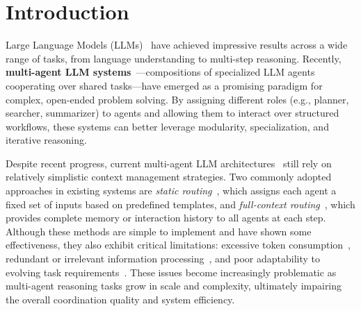 \documentclass[letterpaper]{article} %
\begin{document}
\section{Introduction}

Large Language Models (LLMs)~\cite{team2023gemini,touvron2023llama,vicuna2023,liu2024deepseek,lu2024deepseek} have achieved impressive results across a wide range of tasks, from language understanding to multi-step reasoning. Recently, \textbf{multi-agent LLM systems}~\cite{wu2023autogen,han2024llm,ye2025x,krishnan2025advancing}—compositions of specialized LLM agents cooperating over shared tasks—have emerged as a promising paradigm for complex, open-ended problem solving. By assigning different roles (e.g., planner, searcher, summarizer) to agents and allowing them to interact over structured workflows, these systems can better leverage modularity, specialization, and iterative reasoning.


Despite recent progress, current multi-agent LLM architectures~\cite{crewai2024,wu2023autogen,langgraph2025,GPTResearcher2025,gao2025txagent} still rely on relatively simplistic context management strategies. Two commonly adopted approaches in existing systems are \emph{static routing}~\cite{langgraph2025,gao2024agentscope,ye2025x}, which assigns each agent a fixed set of inputs based on predefined templates, and \emph{full-context routing}~\cite{crewai2024,wu2023autogen,hong2023metagpt}, which provides complete memory or interaction history to all agents at each step. Although these methods are simple to implement and have shown some effectiveness, they also exhibit critical limitations: excessive token consumption~\cite{liu2025rora,li2025mutual,liu2025structured,zhang2025towards,kong2025token}, redundant or irrelevant information processing~\cite{10.1609/aaai.v39i18.34078,ji2025computation,10.1145/3747842,yang2025fairsmoe}, and poor adaptability to evolving task requirements~\cite{liu2024tsla,yuan2022mobile,liu2023scalable}. These issues become increasingly problematic as multi-agent reasoning tasks grow in scale and complexity, ultimately impairing the overall coordination quality and system efficiency. %
\end{document}
